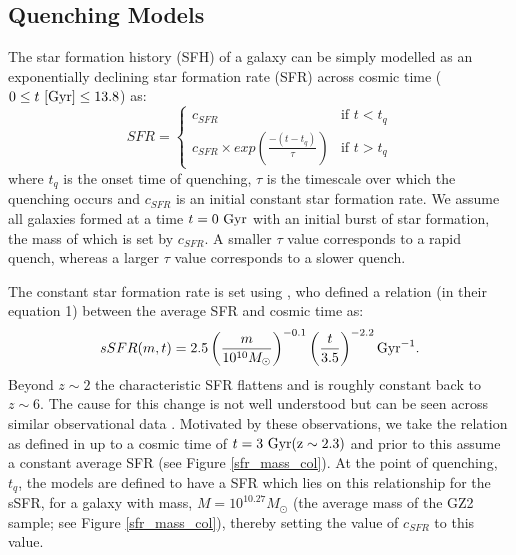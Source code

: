 \documentclass{mn2e}
\begin{document}
\subsection{Quenching Models}\label{quench}
The star formation history (SFH) of a galaxy can be simply modelled as an exponentially declining star formation rate (SFR) across cosmic time ($0 \leq t ~\rm{[Gyr]} \leq 13.8$) as:
\begin{equation}
SFR = 
\begin{cases}
c_{SFR} & \text{if } t < t_q \\
c_{SFR} \times exp{\left( \frac{-(t-t_{q})}{\tau}\right)} & \text{if } t > t_q 
\end{cases}
\end{equation}
where $t_{q}$ is the onset time of quenching, $\tau$ is the timescale over which the quenching occurs and $c_{SFR}$ is an initial constant star formation rate. We assume all galaxies formed at a time $t=0~\rm{Gyr}$ with an initial burst of star formation, the mass of which is set by $c_{SFR}$. A smaller $\tau$ value corresponds to a rapid quench, whereas a larger $\tau$ value corresponds to a slower quench.  

The constant star formation rate is set using \citet{Peng}, who defined a relation (in their equation 1) between the average SFR and cosmic time as:
\begin{equation}
sSFR(m,t) = 2.5 \left( \frac{m}{10^{10} M_{\odot}} \right)^{-0.1} \left(\frac{t}{3.5}\right)^{-2.2} \rm{Gyr}^{-1}.
\end{equation}
Beyond $z \sim 2$ the characteristic SFR flattens and is roughly constant back to $z\sim6$. The cause for this change is not well understood but can be seen across similar observational data \citep{Peng, Gonzalez, Beth}. Motivated by these observations, we take the relation as defined in \citet{Peng} up to a cosmic time of $t=3~\rm{Gyr} (z \sim 2.3)$ and prior to this assume a constant average SFR (see Figure \ref{sfr_mass_col}). At the point of quenching, $t_{q}$, the models are defined to have a SFR which lies on this relationship for the sSFR, for a galaxy with mass, $M = 10^{10.27} M_{\odot}$ (the average mass of the GZ2 sample; see Figure \ref{sfr_mass_col}), thereby setting the value of $c_{SFR}$ to this value.
 
\end{document}
